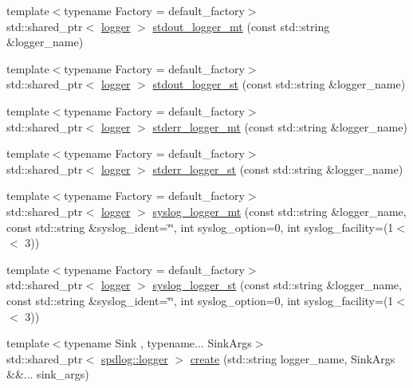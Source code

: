 \begin{DoxyCompactItemize}
\item 
{\footnotesize template$<$typename Factory  = default\+\_\+factory$>$ }\\std\+::shared\+\_\+ptr$<$ \hyperlink{classspdlog_1_1logger}{logger} $>$ \hyperlink{namespacespdlog_a9a6a99d3309b166a585fe918bd83a442}{stdout\+\_\+logger\+\_\+mt} (const std\+::string \&logger\+\_\+name)
\item 
{\footnotesize template$<$typename Factory  = default\+\_\+factory$>$ }\\std\+::shared\+\_\+ptr$<$ \hyperlink{classspdlog_1_1logger}{logger} $>$ \hyperlink{namespacespdlog_a5b0d86b010b11ceb3941265779c7998e}{stdout\+\_\+logger\+\_\+st} (const std\+::string \&logger\+\_\+name)
\item 
{\footnotesize template$<$typename Factory  = default\+\_\+factory$>$ }\\std\+::shared\+\_\+ptr$<$ \hyperlink{classspdlog_1_1logger}{logger} $>$ \hyperlink{namespacespdlog_a93e154fd1e2eb0dc5a82fb25ce7f11d1}{stderr\+\_\+logger\+\_\+mt} (const std\+::string \&logger\+\_\+name)
\item 
{\footnotesize template$<$typename Factory  = default\+\_\+factory$>$ }\\std\+::shared\+\_\+ptr$<$ \hyperlink{classspdlog_1_1logger}{logger} $>$ \hyperlink{namespacespdlog_ad2b234c875e76840785f02b189c0d514}{stderr\+\_\+logger\+\_\+st} (const std\+::string \&logger\+\_\+name)
\item 
{\footnotesize template$<$typename Factory  = default\+\_\+factory$>$ }\\std\+::shared\+\_\+ptr$<$ \hyperlink{classspdlog_1_1logger}{logger} $>$ \hyperlink{namespacespdlog_a49974c7465d12f994929f70c0caeeb7c}{syslog\+\_\+logger\+\_\+mt} (const std\+::string \&logger\+\_\+name, const std\+::string \&syslog\+\_\+ident=\char`\"{}\char`\"{}, int syslog\+\_\+option=0, int syslog\+\_\+facility=(1$<$$<$ 3))
\item 
{\footnotesize template$<$typename Factory  = default\+\_\+factory$>$ }\\std\+::shared\+\_\+ptr$<$ \hyperlink{classspdlog_1_1logger}{logger} $>$ \hyperlink{namespacespdlog_a2b5f25193cf4478d74cf9402a120c902}{syslog\+\_\+logger\+\_\+st} (const std\+::string \&logger\+\_\+name, const std\+::string \&syslog\+\_\+ident=\char`\"{}\char`\"{}, int syslog\+\_\+option=0, int syslog\+\_\+facility=(1$<$$<$ 3))
\item 
{\footnotesize template$<$typename Sink , typename... Sink\+Args$>$ }\\std\+::shared\+\_\+ptr$<$ \hyperlink{classspdlog_1_1logger}{spdlog\+::logger} $>$ \hyperlink{namespacespdlog_a852b420dc3dd5e5193a21f61f8577e62}{create} (std\+::string logger\+\_\+name, Sink\+Args \&\&... sink\+\_\+args)

\end{DoxyCompactItemize}
